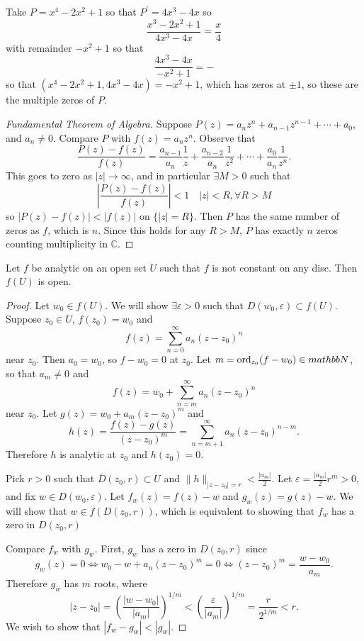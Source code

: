 Take $P = x^4 - 2x^2 + 1$ so that $P^\prime = 4x^3 - 4x$
so
$$
  \frac{x^3 - 2x^2 + 1}{4x^3 - 4x}
= \frac{x}{4}
$$
with remainder $-x^2 + 1$ so that
$$
  \frac{4x^3 - 4x}{-x^2 + 1}
= -
$$
so that $(x^4 - 2x^2 + 1, 4x^3 - 4x) = -x^2 + 1$, which has
zeros at $\pm 1$, so these are the multiple zeros of $P$.

\begin{proof}[Fundamental Theorem of Algebra]
Suppose $P(z) = a_n z^n + a_{n-1} z^{n-1} + \cdots + a_0$, and
$a_n \neq 0$. Compare $P$ with $f(z) = a_n z^n$. Observe that
$$
  \frac{P(z) - f(z)}{f(z)}
= \frac{a_{n-1}}{a_n}\frac{1}{z}
+ \frac{a_{n-2}}{a_n}\frac{1}{z^2}
+ \cdots
+ \frac{a_0}{a_n} \frac{1}{z^n}.
$$
This goes to zero as $|z| \to \infty$, and in particular
$\exists M > 0$ such that
$$
  \left|\frac{P(z) - f(z)}{f(z)}\right|
< 1 \quad |z| < R, \forall R > M
$$
so $|P(z) - f(z)| < |f(z)|$ on $\{|z| = R\}$. Then
$P$ has the same number of zeros as $f$, which is $n$.
Since this holds for any $R > M$, $P$ has exactly $n$
zeros counting multiplicity in $\mathbb{C}$.
\end{proof}

\begin{theorem}
Let $f$ be analytic on an open set $U$ such that $f$
is not constant on any disc. Then $f(U)$ is open.
\end{theorem}

\begin{proof}
Let $w_0 \in f(U)$. We will show $\exists \varepsilon > 0$
such that $D(w_0, \varepsilon) \subset f(U)$. Suppose
$z_0 \in U$, $f(z_0) = w_0$ and
$$
  f(z)
= \sum_{n=0}^\infty a_n (z - z_0)^n
$$ near $z_0$.
Then $a_0 = w_0$, so $f - w_0 = 0$ at $z_0$.
Let $m = \mathrm{ord}_{z_0} (f - w_0) \in mathbb{N}$, so that
$a_m \neq 0$ and
$$
f(z) = w_0 + \sum_{n=m}^\infty a_n (z - z_0)^n
$$
near $z_0$. Let $g(z) = w_0 + a_m (z - z_0)^m$ and
$$
  h(z)
= \frac{f(z) - g(z)}{(z - z_0)^m}
= \sum_{n=m+1}^\infty a_n (z - z_0)^{n-m}.
$$
Therefore $h$ is analytic at $z_0$ and $h(z_0) = 0$.

Pick $r > 0$ such that
$\bar{D}(z_0, r) \subset U$ and
$\| h \|_{|z - z_0| = r} < \frac{|a_m|}{2}$. Let
$\varepsilon = \frac{|a_m|}{2} r^m > 0$, and fix
$w \in D(w_0, \varepsilon)$. Let $f_w(z) = f(z) - w$
and $g_w(z) = g(z) - w$. We will show that
$w \in f(D(z_0, r))$, which is equivalent to showing
that $f_w$ has a zero in $D(z_0, r)$

Compare $f_w$ with $g_w$. First, $g_w$ has a zero in
$D(z_0, r)$ since
$$
     g_w(z) = 0
\iff w_0 - w + a_n(z - z_0)^m = 0
\iff (z - z_0)^m = \frac{w - w_0}{a_m}.
$$
Therefore $g_w$ has $m$ roots, where
$$
  |z - z_0|
= \left(\frac{|w - w_0|}{|a_m|}\right)^{1 / m}
< \left(\frac{\varepsilon}{|a_m|}\right)^{1 / m}
= \frac{r}{2^{1 / m}}
< r.
$$
We wish to show that $|f_w - g_w| < |g_w|$.
\end{proof}
